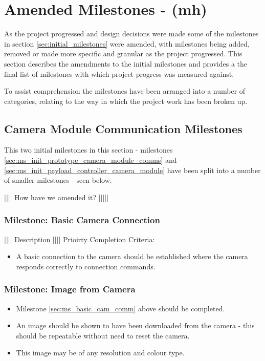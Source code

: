 
\section{Amended Milestones - (mh)}
\label{sec:amended_milestones}
As the project progressed and design decisions were made some of the milestones in section
\ref{sec:initial_milestones} were amended, with milestones being added, removed or made more
specific and granular as the project progressed. This section describes the amendments to the
initial milestones and provides a the final list of milestones with which project progress was measured
against.

To assist comprehension the milestones have been arranged into a number of categories,
relating to the way in which the project work has been broken up. 

\subsection{Camera Module Communication Milestones}
This two initial milestones in this section - milestones \ref{sec:ms_init_prototype_camera_module_comms}
and \ref{sec:ms_init_payload_controller_camera_module}  have been split into a number of smaller
milestones - seen below.

|||| How have we amended it? |||||

	\subsubsection{Milestone: Basic Camera Connection}
		|||| Description ||||
		Prioirty
		Completion Criteria:
		\label{sec:ms_basic_cam_comm}
		\begin{itemize}
			\item 	A basic connection to the camera should be established
				where the camera responds correctly to connection 
				commands.
		\end{itemize}
	
	\subsubsection{Milestone: Image from Camera}
		\label{sec:ms_img_from_cam}
		\begin{itemize}
			\item 	Milestone \ref{sec:ms_basic_cam_comm} above should
				be completed.
			\item 	An image should be shown to have been downloaded 
				from the camera - this should be repeatable without
				need to reset the camera.
			\item 	This image may be of any resolution and colour type.
		\end{itemize} 

